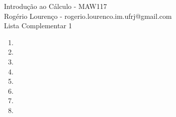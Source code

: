 \documentclass{article}
\begin{document}
\begin{flushleft}
	Introdução ao Cálculo - MAW117\\
	Rogério Lourenço - rogerio.lourenco.im.ufrj@gmail.com\\
	Lista Complementar 1
\end{flushleft}

\begin{enumerate}
	\item 
	\item 
	\item 
	\item 
	\item 
	\item 
	\item 
	\item 
\end{enumerate}
\end{document}
